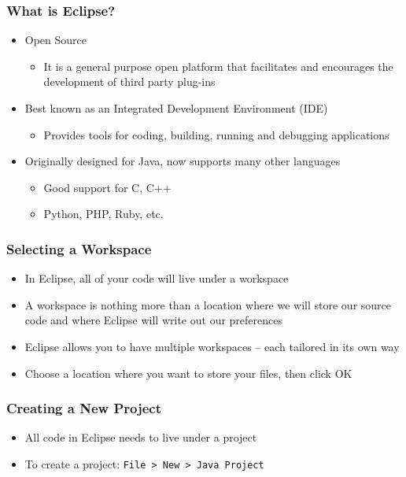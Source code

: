 \documentclass{beamer}
\begin{document}
\begin{frame}[t,fragile] \frametitle{What is Eclipse?} %
    \begin{itemize}
        \item Open Source
        \begin{itemize}
            \item It is a general purpose open platform that facilitates and encourages the development of third party plug-ins
        \end{itemize}
        \item Best known as an Integrated Development Environment (IDE)
        \begin{itemize}
            \item Provides tools for coding, building, running and debugging applications
        \end{itemize}
        \item Originally designed for Java, now supports many other languages
        \begin{itemize}
            \item Good support for C, C++
            \item Python, PHP, Ruby, etc.
        \end{itemize}
    \end{itemize}
\end{frame}

\begin{frame}[t,fragile] \frametitle{Selecting a Workspace} %
    \begin{itemize}
        \item In Eclipse, all of your code will live under a workspace
        \item A workspace is nothing more than a location where we will store our source code and where Eclipse will write out our preferences
        \item Eclipse allows you to have multiple workspaces -- each tailored in its own way
        \item Choose a location where you want to store your files, then click OK
    \end{itemize}
\end{frame}

\begin{frame}[t,fragile] \frametitle{Creating a New Project} %
    \begin{itemize}
        \item All code in Eclipse needs to live under a project
        \item To create a project: \texttt{File > New > Java Project}
    \end{itemize}
\end{frame}
\end{document}
